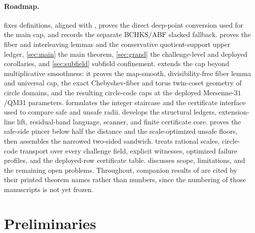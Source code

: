 \documentclass[11pt]{article}
\theoremstyle{definition}
\theoremstyle{remark}
\begin{document}
\paragraph{Roadmap.}  fixes definitions, aligned with \cite[Defs.~4.1, 4.3]{ABF26}, proves the direct deep-point conversion used for the main cap, and records the separate BCHKS/ABF slacked fallback.  proves the fiber and interleaving lemmas and the conservative quotient-support upper ledger, \cref{sec:main} the main theorem, \cref{sec:grand} the challenge-level and deployed corollaries, and \cref{sec:subfield} subfield confinement.  extends the cap beyond multiplicative smoothness: it proves the map-smooth, divisibility-free fiber lemma and universal cap, the exact Chebyshev-fiber and torus twin-coset geometry of circle domains, and the resulting circle-code caps at the deployed Mersenne-$31$/QM31 parameters.  formulates the integer staircase and the certificate interface used to compare safe and unsafe radii.   develops the structural ledgers, extension-line lift, residual-band language, scanner, and finite certificate core.   proves the safe-side pincer below half the distance and the scale-optimized unsafe floors, then assembles the narrowed two-sided sandwich.   treats rational scales, circle-code transport over every challenge field, explicit witnesses, optimized failure profiles, and the deployed-row certificate table.   discusses scope, limitations, and the remaining open problems.  Throughout, companion results of \cite{Cho26a,Cho26b} are cited by their printed theorem names rather than numbers, since the numbering of those manuscripts is not yet frozen.

\section{Preliminaries}\label{sec:prelim}
\end{document}

